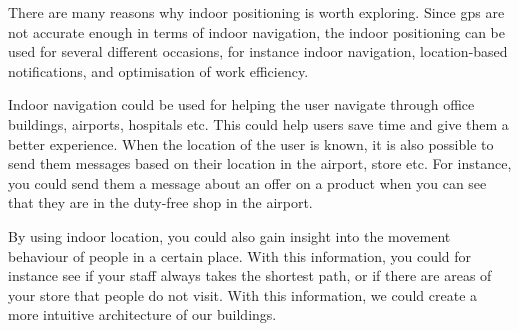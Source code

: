 There are many reasons why indoor positioning is worth exploring. Since \gls{gps} are not accurate enough in terms of indoor navigation, the indoor positioning can be used for several different occasions, for instance indoor navigation, location-based notifications, and optimisation of work efficiency.

Indoor navigation could be used for helping the user navigate through office buildings, airports, hospitals etc. This could help users save time and give them a better experience. When the location of the user is known, it is also possible to send them messages based on their location in the airport, store etc. For instance, you could send them a message about an offer on a product when you can see that they are in the duty-free shop in the airport. 

By using indoor location, you could also gain insight into the movement behaviour of people in a certain place. With this information, you could for instance see if your staff always takes the shortest path, or if there are areas of your store that people do not visit. With this information, we could create a more intuitive architecture of our buildings.\cite{IPSMapsPeople}

